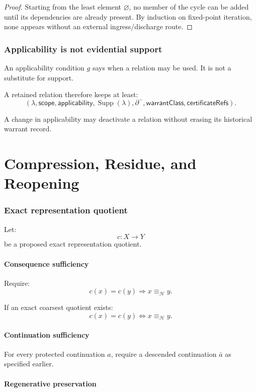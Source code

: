 \documentclass[11pt,oneside]{article}
\newcommand{\Supp}{\operatorname{Supp}}
\begin{document}
\begin{proof}
Starting from the least element \(\varnothing\), no member of the cycle can be added until its dependencies are already present.  By induction on fixed-point iteration, none appears without an external ingress/discharge route.
\end{proof}

\section{Applicability is not evidential support}

An applicability condition \(g\) says when a relation may be used.  It is not a substitute for support.

A retained relation therefore keeps at least:
\[
\boxed{
(
\lambda,
\mathsf{scope},
\mathsf{applicability},
\Supp(\lambda),
\partial^-,
\mathsf{warrantClass},
\mathsf{certificateRefs}
).
}
\]

A change in applicability may deactivate a relation without erasing its historical warrant record.

\part{Compression, Residue, and Reopening}

\section{Exact representation quotient}

Let:
\[
c:X\to Y
\]
be a proposed exact representation quotient.

\subsection{Consequence sufficiency}

Require:
\[
\boxed{
c(x)=c(y)
\Longrightarrow
x\equiv_{\mathcal H}y.
}
\]

If an exact coarsest quotient exists:
\[
c(x)=c(y)
\iff
x\equiv_{\mathcal H}y.
\]

\subsection{Continuation sufficiency}

For every protected continuation \(a\), require a descended continuation \(\bar a\) as specified earlier.


\subsection{Regenerative preservation}
\end{document}
